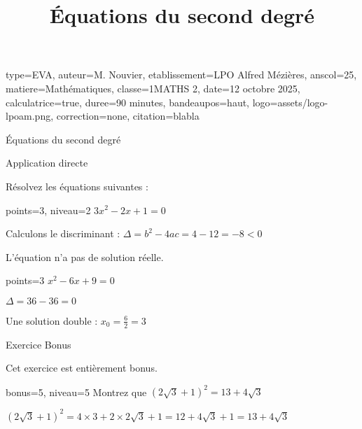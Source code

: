 \documentclass[theme=vert]{nfdevoirs}
\title{Équations du second degré}
\begin{document}
\begin{devoir}{
        type=EVA,
        auteur={M. Nouvier},
        etablissement={LPO Alfred Mézières},
        anscol=25,
        matiere={Mathématiques},
        classe={1MATHS 2},
        date={12 octobre 2025},
        calculatrice=true,
        duree={90 minutes},
        bandeaupos=haut,
        logo={assets/logo-lpoam.png},
        correction=none,
        citation={blabla}
    }

    \begin{partie}{Équations du second degré}

        \begin{exercice}{Application directe}

            Résolvez les équations suivantes :

            \begin{question}{points=3, niveau=2}
                $3x^2 - 2x + 1 = 0$
            \end{question}

            \begin{correction}
                Calculons le discriminant : $\Delta = b^2 - 4ac = 4 - 12 = -8 < 0$

                L'équation n'a pas de solution réelle.
            \end{correction}

            \begin{question}{points=3}
                $x^2 - 6x + 9 = 0$
            \end{question}

            \begin{correction}
                $\Delta = 36 - 36 = 0$

                Une solution double : $x_0 = \frac{6}{2} = 3$
            \end{correction}

        \end{exercice}

        \begin{exercice}{Exercice Bonus}

            Cet exercice est entièrement bonus.

            \begin{question}{bonus=5, niveau=5}
                Montrez que $(2\sqrt{3} + 1)^2 = 13 + 4\sqrt{3}$
            \end{question}

            \begin{correction}
                $(2\sqrt{3} + 1)^2 = 4 \times 3 + 2 \times 2\sqrt{3} + 1 = 12 + 4\sqrt{3} + 1 = 13 + 4\sqrt{3}$
            \end{correction}

        \end{exercice}

    \end{partie}

\end{devoir}
\end{document}
